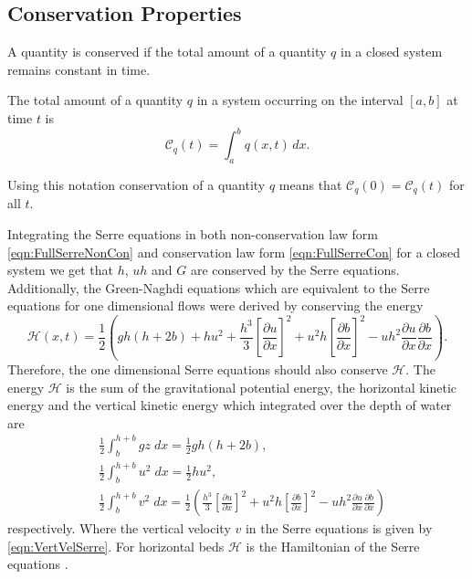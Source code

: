 \subsection{Conservation Properties}
A quantity is conserved if the total amount of a quantity $q$ in a closed system remains constant in time.
\begin{defn}
	\label{defn:TotalAmmountab}
	The total amount of a quantity $q$ in a system occurring on the interval $[a,b]$ at time $t$ is
	\begin{equation*}
	\mathcal{C}_q(t) = \int_{a}^{b} q(x,t)\, dx.
	\end{equation*}
\end{defn}
Using this notation conservation of a quantity $q$ means that $\mathcal{C}_{q}(0) = \mathcal{C}_{q}(t)$ for all $t$. 

Integrating the Serre equations in both non-conservation law form \eqref{eqn:FullSerreNonCon} and conservation law form \eqref{eqn:FullSerreCon} for a closed system we get that $h$, $uh$ and $G$ are conserved by the Serre equations. Additionally, the Green-Naghdi equations \cite{Green-Naghdi-1976-237} which are equivalent to the Serre equations for one dimensional flows were derived by conserving the energy
\begin{equation}
	\mathcal{H}(x,t) = \frac{1}{2} \left( gh\left(h + 2b\right) + hu^2  + \frac{h^3}{3} \left[\frac{\partial u}{\partial x}\right]^2 + u^2h\left[\frac{\partial b}{\partial x}\right]^2 - uh^2 \frac{\partial u}{\partial x} \frac{\partial b}{\partial x}  \right).
	\label{eqn:Hamildef}
\end{equation}
Therefore, the one dimensional Serre equations should also conserve $\mathcal{H}$. The energy $\mathcal{H}$ is the sum of the gravitational potential energy, the horizontal kinetic energy and the vertical kinetic energy which integrated over the depth of water are
\begin{align*}
& \frac{1}{2}\int_{b}^{h +b} gz \; dx = \frac{1}{2}gh\left(h + 2b\right), \\
& \frac{1}{2}\int_{b}^{h +b} u^2 \; dx = \frac{1}{2}hu^2, \\
& \frac{1}{2}\int_{b}^{h +b} v^2 \; dx = \frac{1}{2} \left(\frac{h^3}{3} \left[\frac{\partial u}{\partial x}\right]^2 + u^2h\left[\frac{\partial b}{\partial x}\right]^2 - uh^2 \frac{\partial u}{\partial x} \frac{\partial b}{\partial x} \right)
\end{align*}
respectively. Where the vertical velocity $v$ in the Serre equations is given by \eqref{eqn:VertVelSerre}. For horizontal beds $\mathcal{H}$ is the Hamiltonian of the Serre equations \cite{Li-Y-2002}.
 
